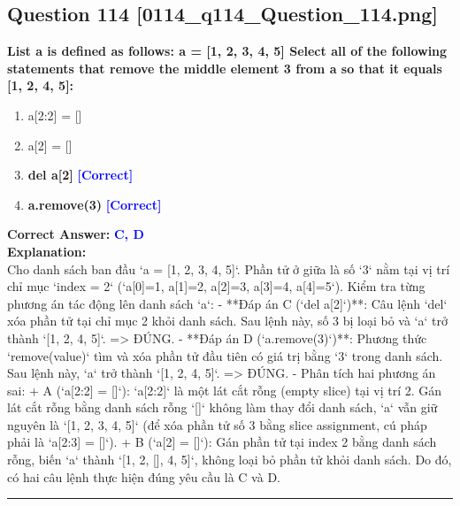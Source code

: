 \documentclass[11pt,a4paper]{article}
\begin{document}
\begin{minipage}{\textwidth}
\subsection*{Question 114 \quad \footnotesize{[0114_q114_Question_114.png]}}
\noindent \textbf{List a is defined as follows: a = [1, 2, 3, 4, 5] Select all of the following statements that remove the middle element 3 from a so that it equals [1, 2, 4, 5]:}

\begin{enumerate}[label=\Alph*.]
    \item a[2:2] = []
    \item a[2] = []
    \item \textbf{del a[2]} \hfill \textcolor{blue}{\textbf{[Correct]}}
    \item \textbf{a.remove(3)} \hfill \textcolor{blue}{\textbf{[Correct]}}
\end{enumerate}

\noindent \textbf{Correct Answer:} \textcolor{blue}{\textbf{C, D}} \\[4pt]
\noindent \textbf{Explanation:}\\
Cho danh sách ban đầu `a = [1, 2, 3, 4, 5]`. Phần tử ở giữa là số `3` nằm tại vị trí chỉ mục `index = 2` (`a[0]=1, a[1]=2, a[2]=3, a[3]=4, a[4]=5`).\newline
Kiểm tra từng phương án tác động lên danh sách `a`:\newline
- **Đáp án C (`del a[2]`)**: Câu lệnh `del` xóa phần tử tại chỉ mục 2 khỏi danh sách. Sau lệnh này, số 3 bị loại bỏ và `a` trở thành `[1, 2, 4, 5]`. => ĐÚNG.\newline
- **Đáp án D (`a.remove(3)`)**: Phương thức `remove(value)` tìm và xóa phần tử đầu tiên có giá trị bằng `3` trong danh sách. Sau lệnh này, `a` trở thành `[1, 2, 4, 5]`. => ĐÚNG.\newline
- Phân tích hai phương án sai:\newline
  + A (`a[2:2] = []`): `a[2:2]` là một lát cắt rỗng (empty slice) tại vị trí 2. Gán lát cắt rỗng bằng danh sách rỗng `[]` không làm thay đổi danh sách, `a` vẫn giữ nguyên là `[1, 2, 3, 4, 5]` (để xóa phần tử số 3 bằng slice assignment, cú pháp phải là `a[2:3] = []`).\newline
  + B (`a[2] = []`): Gán phần tử tại index 2 bằng danh sách rỗng, biến `a` thành `[1, 2, [], 4, 5]`, không loại bỏ phần tử khỏi danh sách.\newline
Do đó, có hai câu lệnh thực hiện đúng yêu cầu là C và D.
\end{minipage}
\vspace{0.8cm}
\hrule
\vspace{0.5cm}
\end{document}
